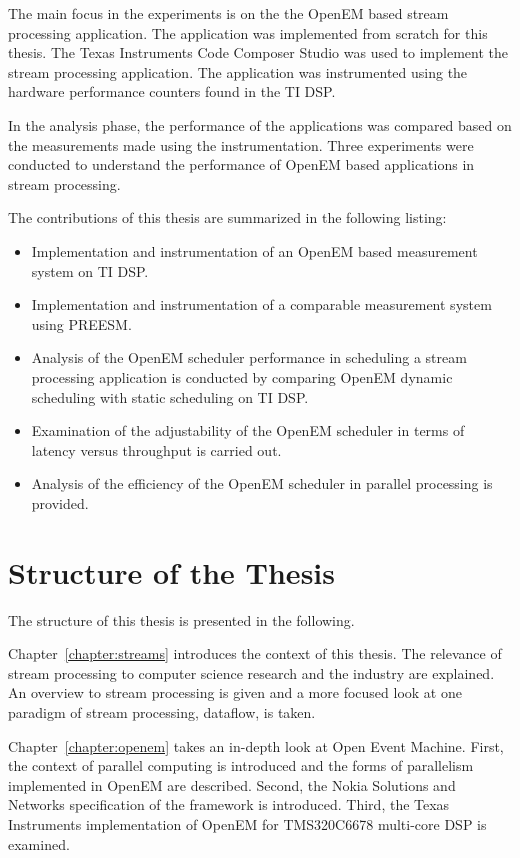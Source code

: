 The main focus in the experiments is on the the OpenEM based stream processing application. The application was implemented from scratch for this thesis. The Texas Instruments Code Composer Studio was used to implement the stream processing application. The application was instrumented using the hardware performance counters found in the TI DSP.

In the analysis phase, the performance of the applications was compared based on the measurements made using the instrumentation. Three experiments were conducted to understand the performance of OpenEM based applications in stream processing.

The contributions of this thesis are summarized in the following listing:
\begin{itemize}
    \item Implementation and instrumentation of an OpenEM based measurement system on TI DSP.
    \item Implementation and instrumentation of a comparable measurement system using PREESM.
    \item Analysis of the OpenEM scheduler performance in scheduling a stream processing application is conducted by comparing OpenEM dynamic scheduling with static scheduling on TI DSP.
    \item Examination of the adjustability of the OpenEM scheduler in terms of latency versus throughput is carried out.
    \item Analysis of the efficiency of the OpenEM scheduler in parallel processing is provided.
\end{itemize}

\section{Structure of the Thesis}
\label{section:structure}
The structure of this thesis is presented in the following.

Chapter~\ref{chapter:streams} introduces the context of this thesis. The relevance of stream processing to computer science research and the industry are explained. An overview to stream processing is given and a more focused look at one paradigm of stream processing, dataflow, is taken.

Chapter~\ref{chapter:openem} takes an in-depth look at Open Event Machine. First, the context of parallel computing is introduced and the forms of parallelism implemented in OpenEM are described. Second, the Nokia Solutions and Networks specification of the framework is introduced. Third, the Texas Instruments implementation of OpenEM for TMS320C6678 multi-core DSP is examined.

